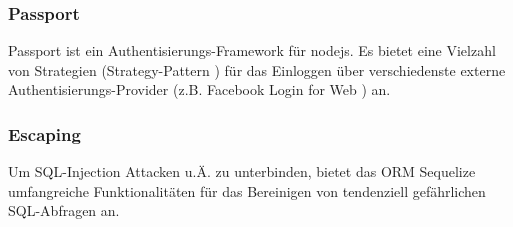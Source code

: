 \subsubsection*{Passport}
Passport \cite{Passportjs} ist ein Authentisierungs-Framework für \gls{nodejs}. Es bietet eine Vielzahl von Strategien (Strategy-Pattern \cite{StrategyPattern}) für das Einloggen über verschiedenste externe Authentisierungs-Provider (z.B. Facebook Login for Web \cite{facebooklogin}) an.

\subsubsection*{Escaping}
Um SQL-Injection \cite{sqlinjection} Attacken u.Ä. zu unterbinden, bietet das \gls{ORM} Sequelize \cite{Sequelize} umfangreiche Funktionalitäten für das Bereinigen von tendenziell gefährlichen \gls{SQL}-Abfragen an.